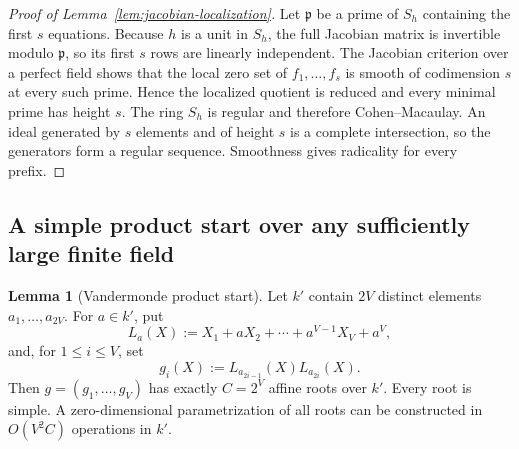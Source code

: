 \documentclass[11pt,a4paper]{article}
\theoremstyle{definition}
\newtheorem{lemma}[theorem]{Lemma}
\theoremstyle{remark}
\begin{document}
\begin{proof}[Proof of Lemma~\ref{lem:jacobian-localization}]
Let $\mathfrak p$ be a prime of $S_h$ containing the first $s$ equations.
Because $h$ is a unit in $S_h$, the full Jacobian matrix is invertible modulo
$\mathfrak p$, so its first $s$ rows are linearly independent.  The Jacobian
criterion over a perfect field shows that the local zero set of
$f_1,\ldots,f_s$ is smooth of codimension $s$ at every such prime.  Hence the
localized quotient is reduced and every minimal prime has height $s$.  The
ring $S_h$ is regular and therefore Cohen--Macaulay.  An ideal generated by
$s$ elements and of height $s$ is a complete intersection, so the generators
form a regular sequence.  Smoothness gives radicality for every prefix.
\end{proof}

\subsection{A simple product start over any sufficiently large finite field}

\begin{lemma}[Vandermonde product start]\label{lem:ff-vandermonde-start}
Let $k'$ contain $2V$ distinct elements $a_1,\ldots,a_{2V}$.  For $a\in k'$, put
\begin{equation}\label{eq:La}
 L_a(X):=X_1+aX_2+\cdots+a^{V-1}X_V+a^V,
\end{equation}
and, for $1\le i\le V$, set
\begin{equation}\label{eq:vandermonde-start}
 g_i(X):=L_{a_{2i-1}}(X)L_{a_{2i}}(X).
\end{equation}
Then $g=(g_1,\ldots,g_V)$ has exactly $C=2^V$ affine roots over $k'$.  Every root is simple.  A zero-dimensional parametrization of all roots can be constructed in $O(V^2C)$ operations in $k'$.
\end{lemma}
\end{document}
